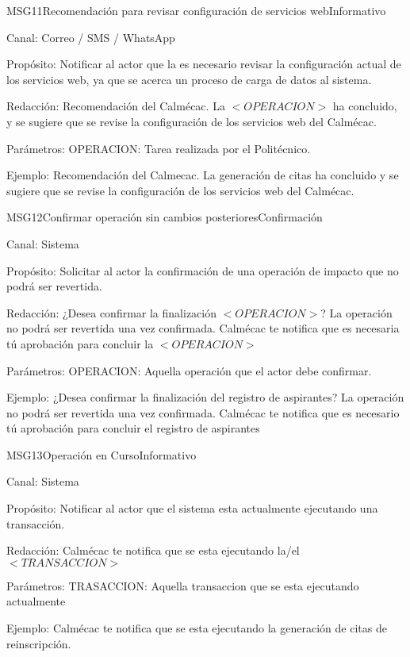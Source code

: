\begin{mensaje}{MSG11}{Recomendación para revisar configuración de servicios web}{Informativo}
	\item[Canal:] Correo / SMS / WhatsApp
	\item[Propósito:] Notificar al actor que la es necesario revisar la configuración actual de los servicios web, ya que se acerca un proceso de carga de datos al sistema.
	\item[Redacción:] Recomendación del Calmécac. La $<OPERACION>$ ha concluido, y se sugiere que se revise la configuración de los servicios web del Calmécac.
	\item[Parámetros:] OPERACION: Tarea realizada por el Politécnico.
	\item[Ejemplo:] Recomendación del Calmecac. La generación de citas ha concluido y se sugiere que se revise la configuración de los servicios web del Calmécac.
		
\end{mensaje}


\begin{mensaje}{MSG12}{Confirmar operación sin cambios posteriores}{Confirmación}
	\item[Canal:] Sistema
	\item[Propósito:] Solicitar al actor la confirmación de una operación de impacto que no podrá ser revertida.
	\item[Redacción:] ¿Desea confirmar la finalización $<OPERACION>$? La operación no podrá ser revertida una vez confirmada.
	Calmécac te notifica que es necesaria tú aprobación para concluir la $<OPERACION>$
	\item[Parámetros:] OPERACION: Aquella operación que el actor debe confirmar.
	\item[Ejemplo:] ¿Desea confirmar la finalización del registro de aspirantes? La operación no podrá ser revertida una vez confirmada.
	Calmécac te notifica que es necesario tú aprobación para concluir el registro de aspirantes
	
\end{mensaje}

\begin{mensaje}{MSG13}{Operación en Curso}{Informativo}
	\item[Canal:] Sistema
	\item[Propósito:] Notificar al actor que el sistema esta actualmente ejecutando una transacción.
	\item[Redacción:] Calmécac te notifica que se esta ejecutando la/el $<TRANSACCION>$
	\item[Parámetros:] TRASACCION: Aquella transaccion que se esta ejecutando actualmente
	\item[Ejemplo:] Calmécac te notifica que se esta ejecutando la generación de citas de reinscripción.
	    
\end{mensaje}


